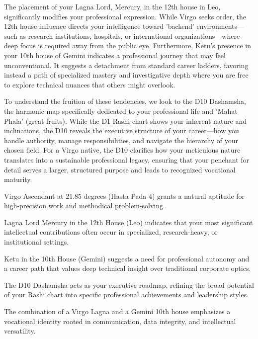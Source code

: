 {\fontsize{9}{13}\selectfont The placement of your Lagna Lord, Mercury, in the 12th house in Leo, significantly modifies your professional expression. While Virgo seeks order, the 12th house influence directs your intelligence toward 'backend' environments---such as research institutions, hospitals, or international organizations---where deep focus is required away from the public eye. Furthermore, Ketu's presence in your 10th house of Gemini indicates a professional journey that may feel unconventional. It suggests a detachment from standard career ladders, favoring instead a path of specialized mastery and investigative depth where you are free to explore technical nuances that others might overlook.}\par\vspace{1.8mm}

{\fontsize{9}{13}\selectfont To understand the fruition of these tendencies, we look to the D10 Dashamsha, the harmonic map specifically dedicated to your professional life and 'Mahat Phala' (great fruits). While the D1 Rashi chart shows your inherent nature and inclinations, the D10 reveals the executive structure of your career---how you handle authority, manage responsibilities, and navigate the hierarchy of your chosen field. For a Virgo native, the D10 clarifies how your meticulous nature translates into a sustainable professional legacy, ensuring that your penchant for detail serves a larger, structured purpose and leads to recognized vocational maturity.}\par\vspace{1.8mm}

\begin{diamondlist}
  \item {\fontsize{8.5}{12}\selectfont Virgo Ascendant at 21.85 degrees (Hasta Pada 4) grants a natural aptitude for high-precision work and methodical problem-solving.}
  \item {\fontsize{8.5}{12}\selectfont Lagna Lord Mercury in the 12th House (Leo) indicates that your most significant intellectual contributions often occur in specialized, research-heavy, or institutional settings.}
  \item {\fontsize{8.5}{12}\selectfont Ketu in the 10th House (Gemini) suggests a need for professional autonomy and a career path that values deep technical insight over traditional corporate optics.}
  \item {\fontsize{8.5}{12}\selectfont The D10 Dashamsha acts as your executive roadmap, refining the broad potential of your Rashi chart into specific professional achievements and leadership styles.}
  \item {\fontsize{8.5}{12}\selectfont The combination of a Virgo Lagna and a Gemini 10th house emphasizes a vocational identity rooted in communication, data integrity, and intellectual versatility.}
\end{diamondlist}

